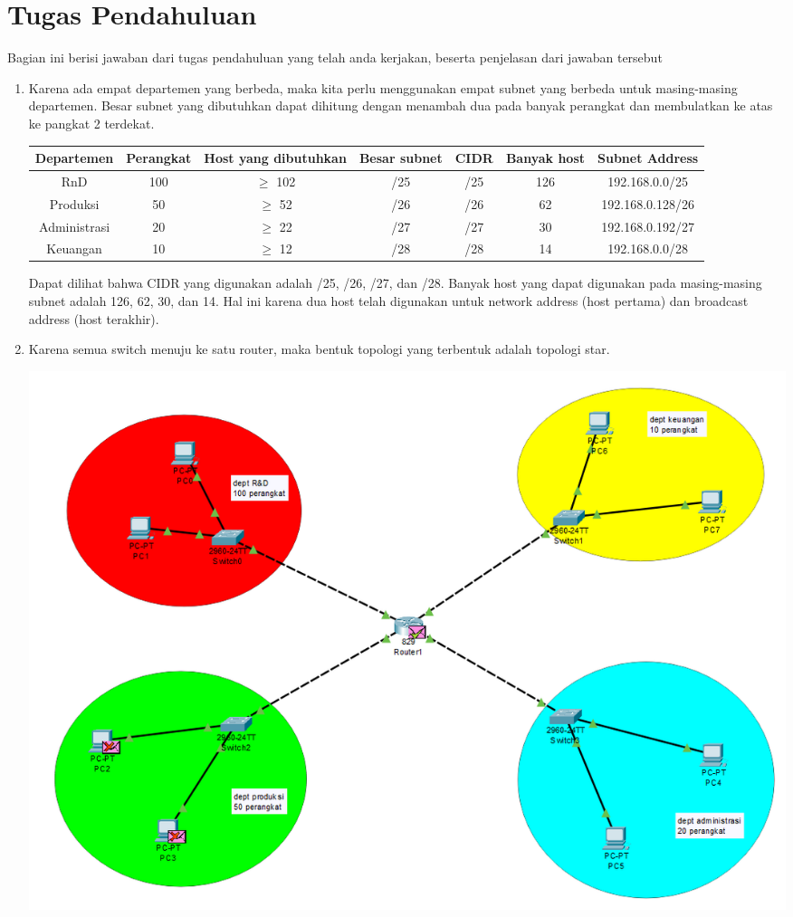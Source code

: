 \section{Tugas Pendahuluan}
Bagian ini berisi jawaban dari tugas pendahuluan yang telah anda kerjakan, beserta penjelasan dari jawaban tersebut
\begin{enumerate}
	\item Karena ada empat departemen yang berbeda, maka kita perlu 
	menggunakan empat subnet yang berbeda untuk masing-masing 
	departemen. Besar subnet yang dibutuhkan dapat dihitung 
	dengan menambah dua pada banyak perangkat dan membulatkan 
	ke atas ke pangkat 2 terdekat.
	{\small
		\begin{center}
		\begin{tabular}{ |c|c|c|c|c|c|c| } 
			\hline
			Departemen & Perangkat & Host yang dibutuhkan & Besar subnet & CIDR & Banyak host & Subnet Address \\
			\hline
			RnD & 100 & $ \geq $ 102 & /25 & /25 & 126 & 192.168.0.0/25 \\
			Produksi & 50 & $ \geq $ 52 & /26 & /26 & 62 & 192.168.0.128/26 \\
			Administrasi & 20 & $ \geq $ 22 & /27 & /27 & 30 & 192.168.0.192/27 \\
			Keuangan & 10 & $ \geq $ 12 & /28 & /28 & 14 & 192.168.0.0/28 \\
			\hline
		\end{tabular}
		\end{center}
	}
	Dapat dilihat bahwa CIDR yang digunakan adalah /25, /26, /27, dan /28.
	Banyak host yang dapat digunakan pada masing-masing subnet adalah 126, 
	62, 30, dan 14. Hal ini karena dua host telah digunakan untuk network 
	address (host pertama) dan broadcast address (host terakhir).
	\item Karena semua switch menuju ke satu router, 
	maka bentuk topologi yang terbentuk adalah topologi star.
	\begin{center}
		\includegraphics[scale=0.4]{P1/img/image.png}

\end{center}
\end{enumerate}
